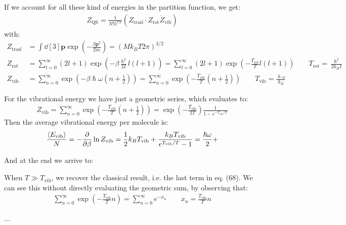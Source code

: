 \documentclass[../../main.tex]{subfiles}
\begin{document}
If we account for all these kind of energies in the partition function, we get:
\begin{align*}
    Z_{\mathrm{QS} } = \frac{1}{N! h^{7N}} (Z_{\mathrm{trasl} } \cdot Z_{\mathrm{rot}} \dot Z_{\mathrm{vib}})
\end{align*}
with:
\begin{align*}
    Z_{\mathrm{trasl}} &= \int \dd[3]{\bm{p}} \exp\left(-\frac{\beta \bm{p}^2}{2m} \right) = (M k_B T 2 \pi)^{3/2}\\
    Z_{\mathrm{rot}} &= \sum_{l=0}^{\infty} (2l+1) \exp\left(-\beta \frac{\hslash^2}{2 I} l(l+1) \right) = \sum_{l=0}^\infty (2l+1) \exp\left(-\frac{T_{\mathrm{rot}}}{T} l(l+1) \right) \qquad T_{\mathrm{rot}} = \frac{\hslash^2}{2 k_B I}\\
    Z_{\mathrm{vib}} &= \sum_{n=0}^\infty \exp\left(-\beta \hslash \omega \left(n + \frac{1}{2} \right)\right)  = \sum_{n = 0}^\infty \exp\left(-\frac{T_{\mathrm{vib} }}{T} \left(n + \frac{1}{2} \right) \right) \qquad T_{\mathrm{vib} } = \frac{\hslash \omega}{k_B} 
\end{align*}

For the vibrational energy we have just a geometric series, which evaluates to:
\begin{align*}
    Z_{\mathrm{vib}} = \sum_{n=0}^\infty \exp\left(-\frac{T_{\mathrm{vib} }}{T} \left(n+\frac{1}{2} \right) \right) = \exp\left(-\frac{T_{\mathrm{vib} }}{2 T} \right) \frac{1}{1 - e^{-T_{\mathrm{vib} }/T}} 
\end{align*}
Then the average vibrational energy per molecule is:
\begin{align*}
    \frac{\langle E_{\mathrm{vib} } \rangle}{N} = -\pdv{\beta} \ln Z_{\mathrm{vib} } = \frac{1}{2} k_B T_{\mathrm{vib} } + \frac{k_B T_{\mathrm{vib} }}{e^{T_{\mathrm{vib} }/T} - 1} = \frac{\hslash \omega}{2}   +
\end{align*}

And at the end we arrive to:


\medskip

When $T \gg T_{\mathrm{vib}}$, we recover the classical result, i.e. the last term in eq. (68). We can see this without directly evaluating the geometric sum, by observing that:
\begin{align*}
    \sum_{n=0}^\infty \exp\left(-\frac{T_{\mathrm{vib} }}{T} n \right) = \sum_{n=0}^\infty e^{-x_n} \qquad x_n = \frac{T_{\mathrm{vib} }}{T} n 
\end{align*}

...
\end{document}
